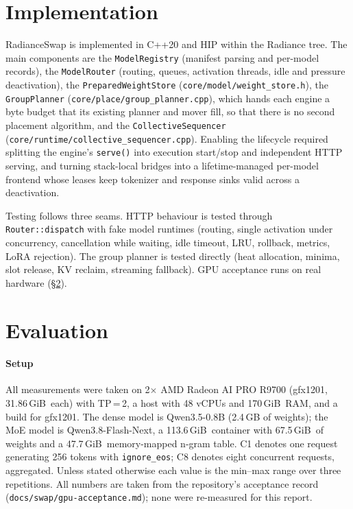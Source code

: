 \documentclass[10pt,conference,a4paper]{IEEEtran}
\newcommand{\code}[1]{\texttt{#1}}
\newcommand{\GiB}{\,GiB}
\begin{document}
\section{Implementation}

RadianceSwap is implemented in C++20 and HIP within the Radiance tree. The main components are the
\code{ModelRegistry} (manifest parsing and per-model records), the \code{ModelRouter} (routing,
queues, activation threads, idle and pressure deactivation), the \code{PreparedWeightStore}
(\code{core/model/weight\_store.h}), the \code{GroupPlanner} (\code{core/place/group\_planner.cpp}),
which hands each engine a byte budget that its existing planner and mover fill, so that there is no
second placement algorithm, and the \code{CollectiveSequencer}
(\code{core/runtime/collective\_sequencer.cpp}). Enabling the lifecycle required splitting the
engine's \code{serve()} into execution start/stop and independent HTTP serving, and turning
stack-local bridges into a lifetime-managed per-model frontend whose leases keep tokenizer and
response sinks valid across a deactivation.

Testing follows three seams. HTTP behaviour is tested through \code{Router::dispatch} with fake model
runtimes (routing, single activation under concurrency, cancellation while waiting, idle timeout, LRU,
rollback, metrics, LoRA rejection). The group planner is tested directly (heat allocation, minima,
slot release, KV reclaim, streaming fallback). GPU acceptance runs on real hardware
(\S\ref{sec:eval}).

\section{Evaluation}\label{sec:eval}

\paragraph{Setup} All measurements were taken on 2$\times$ AMD Radeon AI PRO R9700 (gfx1201,
31.86\GiB\ each) with TP\,=\,2, a host with 48 vCPUs and 170\GiB\ RAM, and a build for gfx1201. The
dense model is Qwen3.5-0.8B (2.4\,GB of weights); the MoE model is Qwen3.8-Flash-Next, a
113.6\GiB\ container with 67.5\GiB\ of weights and a 47.7\GiB\ memory-mapped n-gram table.
C1 denotes one request generating 256 tokens with \code{ignore\_eos}; C8 denotes eight concurrent
requests, aggregated. Unless stated otherwise each value is the min--max range over three
repetitions. All numbers are taken from the repository's acceptance record
(\code{docs/swap/gpu-acceptance.md}); none were re-measured for this report.
\end{document}
